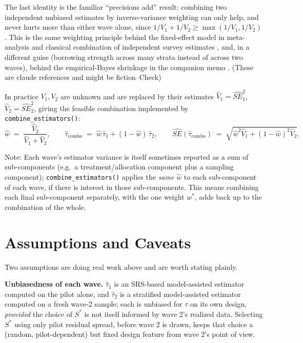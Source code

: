 \documentclass[12pt]{article}
\newcommand{\tauhat}{\hat\tau}
\begin{document}
The last identity is the familiar ``precisions add'' result: combining two independent unbiased estimates by inverse-variance weighting can only help, and never hurts more than either wave alone, since $1/V_1 + 1/V_2 \ge \max(1/V_1, 1/V_2)$.
This is the same weighting principle behind the fixed-effect model in meta-analysis \citep{dersimonian1986meta} and classical combination of independent survey estimates \citep{cochran1977sampling}, and, in a different guise (borrowing strength across many strata instead of across two waves), behind the empirical-Bayes shrinkage in the companion memo \citep{fay1979estimates}.
(These are claude references and might be fiction--Check)

In practice $V_1, V_2$ are unknown and are replaced by their estimates $\hat V_1 = \widehat{SE}_1^2$, $\hat V_2 = \widehat{SE}_2^2$, giving the feasible combination implemented by \texttt{combine\_estimators()}:
\[
  \hat w \;=\; \frac{\hat V_2}{\hat V_1 + \hat V_2}, \qquad
  \tauhat_{\text{combo}} \;=\; \hat w\, \tauhat_1 + (1-\hat w)\, \tauhat_2, \qquad
  \widehat{SE}(\tauhat_{\text{combo}}) \;=\; \sqrt{\hat w^2 \hat V_1 + (1-\hat w)^2 \hat V_2}.
\]


Note: Each wave's estimator variance is itself sometimes reported as a sum of sub-components (e.g.\ a treatment/allocation component plus a sampling component); \texttt{combine\_estimators()} applies the \emph{same} $\hat w$ to each sub-component of each wave, if there is interest in those sub-components.
This means combining each final sub-component separately, with the one weight $w^\ast$, adds back up to the combination of the whole.


\section{Assumptions and Caveats}
\label{sec:caveats}

Two assumptions are doing real work above and are worth stating plainly.

\textbf{Unbiasedness of each wave.}
$\tauhat_1$ is an SRS-based model-assisted estimator computed on the pilot alone, and $\tauhat_2$ is a stratified model-assisted estimator computed on a fresh wave-2 sample; each is unbiased for $\tau$ on its own design, \emph{provided} the choice of $S^\ast$ is not itself informed by wave 2's realized data.
Selecting $S^\ast$ using only pilot residual spread, before wave 2 is drawn, keeps that choice a (random, pilot-dependent) but fixed design feature from wave 2's point of view.
\end{document}
